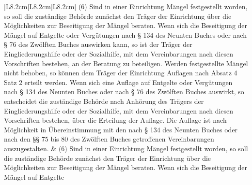 \documentclass[10pt,a4paper,landscape]{article}
\begin{document}
\begin{longtable}{|L{8.2cm}|L{8.2cm}|L{8.2cm}|}
\hhline{|---|}
(6) Sind in einer Einrichtung Mängel  \newline festgestellt worden, so soll die zuständige  \newline Behörde zunächst den Träger der  \newline Einrichtung über die Möglichkeiten zur  \newline Beseitigung der Mängel beraten. Wenn  \newline sich die Beseitigung der Mängel auf  \newline Entgelte oder Vergütungen \textcolor{diffred}{nach \S{} 134 des  \newline Neunten Buches oder} nach \S{} 76 des  \newline Zwölften Buches auswirken kann, so ist der  \newline Träger der Eingliederungshilfe oder der  \newline Sozialhilfe, mit dem Vereinbarungen nach  \newline diesen Vorschriften bestehen, an der  \newline Beratung zu beteiligen. Werden  \newline festgestellte Mängel nicht behoben, so  \newline können dem Träger der Einrichtung  \newline Auflagen nach Absatz 4 Satz 2 erteilt  \newline werden. Wenn sich eine Auflage auf  \newline Entgelte oder Vergütungen nach \S{} \textcolor{diffred}{134 des  \newline Neunten Buches oder nach \S{}} 76 des  \newline Zwölften Buches auswirkt, so entscheidet  \newline die zuständige Behörde nach Anhörung  \newline des Trägers der Eingliederungshilfe oder  \newline der Sozialhilfe, mit dem Vereinbarungen  \newline nach diesen Vorschriften bestehen, über  \newline die Erteilung der Auflage. Die Auflage ist  \newline nach Möglichkeit in Übereinstimmung mit  \newline den nach \textcolor{diffred}{\S{} 134 des Neunten Buches oder  \newline nach} den \S{}\S{} 75 bis 80 des Zwölften  \newline Buches getroffenen Vereinbarungen  \newline auszugestalten. & (6) Sind in einer Einrichtung Mängel  \newline festgestellt worden, so soll die zuständige  \newline Behörde zunächst den Träger der  \newline Einrichtung über die Möglichkeiten zur  \newline Beseitigung der Mängel beraten. Wenn  \newline sich die Beseitigung der Mängel auf  \newline Entgelte 
\end{longtable}
\end{document}

